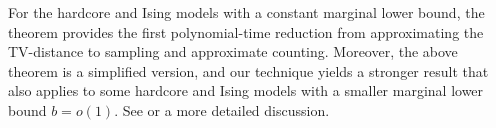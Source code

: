 For the hardcore and Ising models with a constant marginal lower bound, the theorem provides the first polynomial-time reduction from approximating the TV-distance to sampling and approximate counting. Moreover, the above theorem is a simplified version, and our technique yields a stronger result that also applies to some hardcore and Ising models with a smaller marginal lower bound $b = o(1)$. See  or a more detailed discussion.


 


